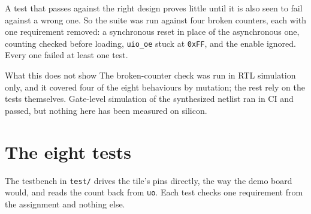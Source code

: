 \documentclass[11pt]{article}
\begin{document}
\begin{hsstatrow}[3]
\end{hsstatrow}

A test that passes against the right design proves little until it is also seen to fail against
a wrong one. So the suite was run against four broken counters, each with one requirement
removed: a synchronous reset in place of the asynchronous one, counting checked before loading,
\texttt{uio\_oe} stuck at \texttt{0xFF}, and the enable ignored. Every one failed at least one
test.


\begin{hscallout}{What this does not show}
The broken-counter check was run in RTL simulation only, and it covered four of the eight
behaviours by mutation; the rest rely on the tests themselves. Gate-level simulation of the
synthesized netlist ran in CI and passed, but nothing here has been measured on silicon.
\end{hscallout}

\newpage

\section{The eight tests}\label{sec:tests}

The testbench in \texttt{test/} drives the tile's pins directly, the way the demo board would,
and reads the count back from \texttt{uo}. Each test checks one requirement from the assignment and nothing else.
\end{document}
